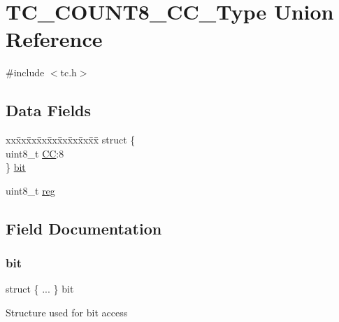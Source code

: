 \hypertarget{union_t_c___c_o_u_n_t8___c_c___type}{}\section{T\+C\+\_\+\+C\+O\+U\+N\+T8\+\_\+\+C\+C\+\_\+\+Type Union Reference}
\label{union_t_c___c_o_u_n_t8___c_c___type}


{\ttfamily \#include $<$tc.\+h$>$}

\subsection*{Data Fields}
\begin{DoxyCompactItemize}
\item 
\begin{tabbing}
xx\=xx\=xx\=xx\=xx\=xx\=xx\=xx\=xx\=\kill
struct \{\\
\>uint8\_t \mbox{\hyperlink{union_t_c___c_o_u_n_t8___c_c___type_a064500d5b4d1bba67bf5794dc0156d19}{CC}}:8\\
\} \mbox{\hyperlink{union_t_c___c_o_u_n_t8___c_c___type_ab733212f3bb4ac99c101abffc08f3985}{bit}}\\

\end{tabbing}\item 
uint8\+\_\+t \mbox{\hyperlink{union_t_c___c_o_u_n_t8___c_c___type_a9428adc9af4653a2050e2536b55dec8d}{reg}}
\end{DoxyCompactItemize}


\subsection{Field Documentation}
\mbox{\label{union_t_c___c_o_u_n_t8___c_c___type_ab733212f3bb4ac99c101abffc08f3985}} 
\subsubsection{\texorpdfstring{bit}{bit}}
{\footnotesize\ttfamily struct \{ ... \}   bit}

Structure used for bit access \mbox{\label{union_t_c___c_o_u_n_t8___c_c___type_a064500d5b4d1bba67bf5794dc0156d19}} 
